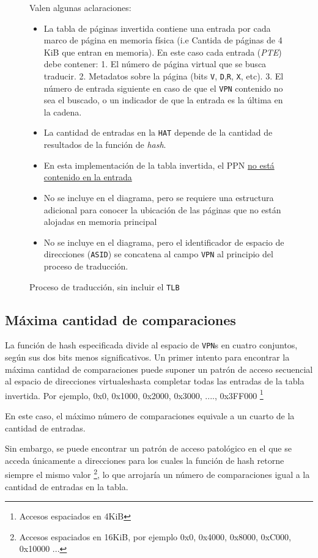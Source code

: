 \documentclass{article}
\begin{document}
\begin{figure}[!h]
\begin{tikzpicture}[x=0.75pt,y=0.75pt,yscale=-1,xscale=1]
\end{tikzpicture}
Valen algunas aclaraciones:
\begin{itemize}
\item La tabla de páginas invertida contiene una entrada por cada marco de página en memoria física (i.e Cantida de páginas de 4 KiB que entran en memoria). En este caso cada entrada (\textit{PTE}) debe contener: 1. El número de página virtual que se busca traducir. 2. Metadatos sobre la página (bits \texttt{V}, \texttt{D},\texttt{R}, \texttt{X}, etc). 3. El número de entrada siguiente en caso de que el \texttt{VPN} contenido no sea el buscado, o un indicador de que la entrada es la última en la cadena.
\item La cantidad de entradas en la \texttt{HAT} depende de la cantidad de resultados de la función de \textit{hash}.
\item En esta implementación de la tabla invertida, el PPN \underline{no está contenido en la entrada}
\item No se incluye en el diagrama, pero se requiere una estructura adicional para conocer la ubicación de las páginas que no están alojadas en memoria principal
\item No se incluye en el diagrama, pero el identificador de espacio de direcciones (\texttt{ASID}) se concatena al campo \texttt{VPN} al principio del proceso de traducción.  
\end{itemize}

\caption{\label{ref::trad-no-tlb} Proceso de traducción, sin incluir el \texttt{TLB}}
\end{figure}


\subsection{Máxima cantidad de comparaciones}
La función de hash especificada divide al espacio de \texttt{VPN}s en cuatro conjuntos, según sus dos bits menos significativos. Un primer intento para encontrar la máxima cantidad de comparaciones puede suponer un patrón de acceso secuencial al espacio de direcciones virtualeshasta completar todas las entradas de la tabla invertida. 
Por ejemplo, 
0x0, 0x1000, 0x2000, 0x3000, ...., 0x3FF000 \footnote{Accesos espaciados en 4KiB}

En este caso, el máximo número de comparaciones equivale a un cuarto de la cantidad de entradas.

Sin embargo, se puede encontrar un patrón de acceso patológico en el que se acceda únicamente a direcciones para los cuales la función de hash retorne siempre el mismo valor \footnote {Accesos espaciados en 16KiB, por ejemplo 0x0, 0x4000, 0x8000, 0xC000, 0x10000 ... }, lo que arrojaría un número de comparaciones igual a la cantidad de entradas en la tabla.
\end{document}
